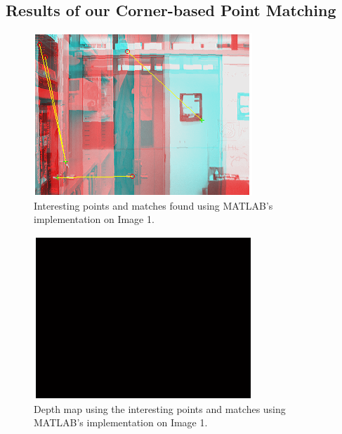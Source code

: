 \subsection{Results of our Corner-based Point Matching}
\begin{figure}[H]\centering
	\includegraphics[width=0.8\linewidth]{Images/01_matlab_match.png}
	\caption{Interesting points and matches found using MATLAB's implementation on Image 1.}
	\label{fig:jp-ofc-matlab-match}
\end{figure}

\begin{figure}[H]\centering
	\includegraphics[width=0.8\linewidth]{Images/01_matlab_depth.png}
	\caption{Depth map using the interesting points and matches using MATLAB's implementation on Image 1.}
	\label{fig:jp-ofc-matlab-depth}
\end{figure}

